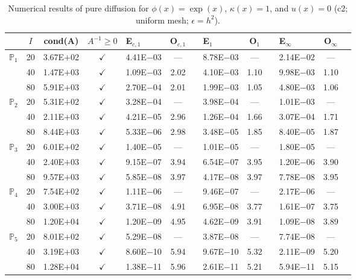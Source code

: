 \begin{table}[H]
\centering
\caption{Numerical results of pure diffusion for $\phi(x)=\exp(x)$, $\kappa(x)=1$, and $u(x)=0$ (c2; uniform mesh; $\epsilon=h^2$).}
\begin{tabular}{@{}l c c c l c c l c c l c c@{}}
\toprule
 & $I$ & cond(A) & $A^{-1}\geq 0$ &  E$_{c,1}$ & O$_{c,1}$ && E$_1$ & O$_1$ && E$_{\infty}$ & O$_{\infty}$\\
\midrule
\multirow{3}{*}{$\mathbb{P}_{1}$}
 & 20 & 3.67E$+$02 & $\checkmark$ & 4.41E$-$03 & --- && 8.78E$-$03 & --- && 2.14E$-$02 & ---\\
 & 40 & 1.47E$+$03 & $\checkmark$ & 1.09E$-$03 & 2.02 && 4.10E$-$03 & 1.10 && 9.98E$-$03 & 1.10\\
 & 80 & 5.91E$+$03 & $\checkmark$ & 2.70E$-$04 & 2.01 && 1.99E$-$03 & 1.05 && 4.80E$-$03 & 1.06\\
\midrule
\multirow{3}{*}{$\mathbb{P}_{2}$}
 & 20 & 5.31E$+$02 & $\checkmark$ & 3.28E$-$04 & --- && 3.98E$-$04 & --- && 1.01E$-$03 & ---\\
 & 40 & 2.11E$+$03 & $\checkmark$ & 4.21E$-$05 & 2.96 && 1.26E$-$04 & 1.66 && 3.07E$-$04 & 1.71\\
 & 80 & 8.44E$+$03 & $\checkmark$ & 5.33E$-$06 & 2.98 && 3.48E$-$05 & 1.85 && 8.40E$-$05 & 1.87\\
\midrule
\multirow{3}{*}{$\mathbb{P}_{3}$}
 & 20 & 6.01E$+$02 & $\checkmark$ & 1.40E$-$05 & --- && 1.01E$-$05 & --- && 1.80E$-$05 & ---\\
 & 40 & 2.40E$+$03 & $\checkmark$ & 9.15E$-$07 & 3.94 && 6.54E$-$07 & 3.95 && 1.20E$-$06 & 3.90\\
 & 80 & 9.57E$+$03 & $\checkmark$ & 5.85E$-$08 & 3.97 && 4.17E$-$08 & 3.97 && 7.78E$-$08 & 3.95\\
\midrule
\multirow{3}{*}{$\mathbb{P}_{4}$}
 & 20 & 7.54E$+$02 & $\checkmark$ & 1.11E$-$06 & --- && 9.46E$-$07 & --- && 2.17E$-$06 & ---\\
 & 40 & 3.00E$+$03 & $\checkmark$ & 3.71E$-$08 & 4.91 && 6.95E$-$08 & 3.77 && 1.61E$-$07 & 3.75\\
 & 80 & 1.20E$+$04 & $\checkmark$ & 1.20E$-$09 & 4.95 && 4.62E$-$09 & 3.91 && 1.09E$-$08 & 3.89\\
\midrule
\multirow{3}{*}{$\mathbb{P}_{5}$}
 & 20 & 8.01E$+$02 & $\checkmark$ & 5.29E$-$08 & --- && 3.87E$-$08 & --- && 7.74E$-$08 & ---\\
 & 40 & 3.19E$+$03 & $\checkmark$ & 8.60E$-$10 & 5.94 && 9.67E$-$10 & 5.32 && 2.11E$-$09 & 5.20\\
 & 80 & 1.28E$+$04 & $\checkmark$ & 1.38E$-$11 & 5.96 && 2.61E$-$11 & 5.21 && 5.94E$-$11 & 5.15\\
\bottomrule
\end{tabular}
\end{table}